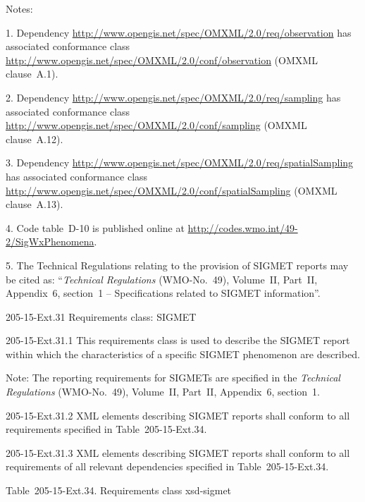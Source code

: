 Notes:

1. Dependency \url{http://www.opengis.net/spec/OMXML/2.0/req/observation} has associated conformance class\\
\url{http://www.opengis.net/spec/OMXML/2.0/conf/observation} (OMXML clause~A.1).

2. Dependency \url{http://www.opengis.net/spec/OMXML/2.0/req/sampling} has associated conformance class\\
\url{http://www.opengis.net/spec/OMXML/2.0/conf/sampling} (OMXML clause~A.12).

3. Dependency \url{http://www.opengis.net/spec/OMXML/2.0/req/spatialSampling} has associated conformance class \url{http://www.opengis.net/spec/OMXML/2.0/conf/spatialSampling} (OMXML clause~A.13).

4. Code table~D-10 is published online at \url{http://codes.wmo.int/49-2/SigWxPhenomena}.

5. The Technical Regulations relating to the provision of SIGMET reports may be cited as: ``\emph{Technical Regulations} (WMO-No.~49), Volume~II, Part~II, Appendix~6, section~1 -- Specifications related to SIGMET information''.

205-15-Ext.31 Requirements class: SIGMET

205-15-Ext.31.1 This requirements class is used to describe the SIGMET report within which the characteristics of a specific SIGMET phenomenon are described.

Note: The reporting requirements for SIGMETs are specified in the \emph{Technical Regulations} (WMO-No.~49), Volume~II, Part~II, Appendix~6, section~1.

205-15-Ext.31.2 XML elements describing SIGMET reports shall conform to all requirements specified in Table~205-15-Ext.34.

205-15-Ext.31.3 XML elements describing SIGMET reports shall conform to all requirements of all relevant dependencies specified in Table~205-15-Ext.34.

Table~205-15-Ext.34. Requirements class xsd-sigmet

